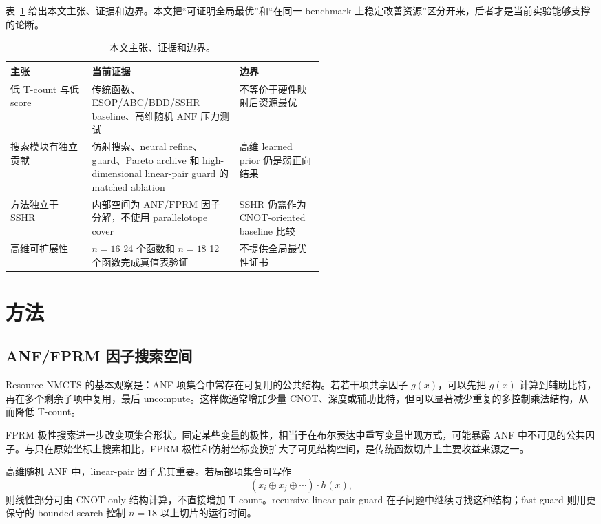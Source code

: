\documentclass[UTF8,fontset=macnew,11pt]{ctexart}
\newcommand{\method}{Resource-NMCTS}
\newcommand{\anf}{\ensuremath{\mathrm{ANF}}}
\newcommand{\fprm}{\ensuremath{\mathrm{FPRM}}}
\begin{document}
表~\ref{tab:claims} 给出本文主张、证据和边界。本文把“可证明全局最优”和“在同一 benchmark 上稳定改善资源”区分开来，后者才是当前实验能够支撑的论断。

\begin{table}[t]
\centering
\small
\caption{本文主张、证据和边界。}
\label{tab:claims}
\begin{tabularx}{\linewidth}{>{\raggedright\arraybackslash}p{0.26\linewidth}
  >{\raggedright\arraybackslash}X
  >{\raggedright\arraybackslash}p{0.27\linewidth}}
\toprule
主张 & 当前证据 & 边界 \\
\midrule
低 T-count 与低 score & 传统函数、ESOP/ABC/BDD/SSHR baseline、高维随机 \anf{} 压力测试 & 不等价于硬件映射后资源最优 \\
搜索模块有独立贡献 & 仿射搜索、neural refine、guard、Pareto archive 和 high-dimensional linear-pair guard 的 matched ablation & 高维 learned prior 仍是弱正向结果 \\
方法独立于 SSHR & 内部空间为 \anf{}/\fprm{} 因子分解，不使用 parallelotope cover & SSHR 仍需作为 CNOT-oriented baseline 比较 \\
高维可扩展性 & $n=16$ 24 个函数和 $n=18$ 12 个函数完成真值表验证 & 不提供全局最优性证书 \\
\bottomrule
\end{tabularx}
\end{table}

\section{方法}

\subsection{ANF/FPRM 因子搜索空间}

\method{} 的基本观察是：ANF 项集合中常存在可复用的公共结构。若若干项共享因子 $g(x)$，可以先把 $g(x)$ 计算到辅助比特，再在多个剩余子项中复用，最后 uncompute。这样做通常增加少量 CNOT、深度或辅助比特，但可以显著减少重复的多控制乘法结构，从而降低 T-count。

FPRM 极性搜索进一步改变项集合形状。固定某些变量的极性，相当于在布尔表达中重写变量出现方式，可能暴露 ANF 中不可见的公共因子。与只在原始坐标上搜索相比，FPRM 极性和仿射坐标变换扩大了可见结构空间，是传统函数切片上主要收益来源之一。

高维随机 \anf{} 中，linear-pair 因子尤其重要。若局部项集合可写作
\begin{equation}
  (x_i\oplus x_j\oplus\cdots)\cdot h(x),
  \label{eq:linear_pair}
\end{equation}
则线性部分可由 CNOT-only 结构计算，不直接增加 T-count。recursive linear-pair guard 在子问题中继续寻找这种结构；fast guard 则用更保守的 bounded search 控制 $n=18$ 以上切片的运行时间。
\end{document}
